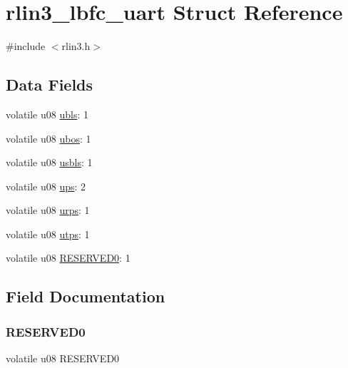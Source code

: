 \hypertarget{structrlin3__lbfc__uart}{}\section{rlin3\+\_\+lbfc\+\_\+uart Struct Reference}
\label{structrlin3__lbfc__uart}


{\ttfamily \#include $<$rlin3.\+h$>$}

\subsection*{Data Fields}
\begin{DoxyCompactItemize}
\item 
volatile u08 \mbox{\hyperlink{structrlin3__lbfc__uart_ae9846ac71fc067b7cc50dee7b4084fec}{ubls}}\+: 1
\item 
volatile u08 \mbox{\hyperlink{structrlin3__lbfc__uart_a95083e168920a5d75e812615173f5e54}{ubos}}\+: 1
\item 
volatile u08 \mbox{\hyperlink{structrlin3__lbfc__uart_a9cf6c1a62601150bc147e0dcf85f8a7e}{usbls}}\+: 1
\item 
volatile u08 \mbox{\hyperlink{structrlin3__lbfc__uart_a45226ac508f466d8c9b425abe42688ab}{ups}}\+: 2
\item 
volatile u08 \mbox{\hyperlink{structrlin3__lbfc__uart_abf066a5e3be4c1ccd1198916e58007ff}{urps}}\+: 1
\item 
volatile u08 \mbox{\hyperlink{structrlin3__lbfc__uart_ab0cee39796e655c62464a5863d394e8d}{utps}}\+: 1
\item 
volatile u08 \mbox{\hyperlink{structrlin3__lbfc__uart_a59c0b30ccfb89f1b34e9682741859abd}{R\+E\+S\+E\+R\+V\+E\+D0}}\+: 1
\end{DoxyCompactItemize}


\subsection{Field Documentation}
\mbox{\label{structrlin3__lbfc__uart_a59c0b30ccfb89f1b34e9682741859abd}} 
\subsubsection{\texorpdfstring{R\+E\+S\+E\+R\+V\+E\+D0}{RESERVED0}}
{\footnotesize\ttfamily volatile u08 R\+E\+S\+E\+R\+V\+E\+D0}

